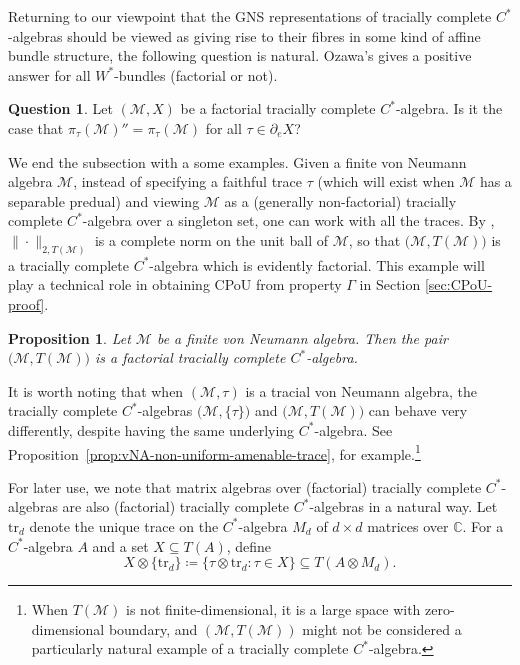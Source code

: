 \documentclass[a4paper,11pt]{amsart}
\newtheorem{proposition}[theorem]{Proposition}
\theoremstyle{definition}
\newtheorem{question}[theorem]{Question}
\numberwithin{equation}{section}
\numberwithin{theorem}{section}
\newcommand{\M}{\mathcal{M}}
\begin{document}
Returning to our viewpoint that the GNS representations of tracially complete $C^*$-algebras should be viewed as giving rise to their fibres in some kind of affine bundle structure, the following question is natural. Ozawa's \cite[Theorem 11]{Oz13} gives a positive answer for all $W^*$-bundles (factorial or not).
\begin{question}\label{Q:fibres}
Let $(\M,X)$ be a factorial tracially complete $C^*$-algebra.  Is it the case that $\pi_\tau(\M)''=\pi_\tau(\M)$ for all $\tau\in\partial_eX$?
\end{question}

We end the subsection with a some examples.  Given a finite von Neumann algebra $\M$, instead of specifying a faithful trace $\tau$ (which will exist when $\M$ has a separable predual) and viewing $\M$ as a (generally non-factorial) tracially complete $C^*$-algebra over a singleton set, one can work with all the traces.  By \cite[Proposition~3.1.6]{Ev18}, $\|\cdot\|_{2, T(\M)}$ is a complete norm on the unit ball of $\M$, so that $\big(\M, T(\M)\big)$ is a tracially complete $C^*$-algebra which is evidently factorial.  This example will play a technical role in obtaining CPoU from property $\Gamma$ in Section \ref{sec:CPoU-proof}.

\begin{proposition}\label{prop:finitevnastc}
    Let $\M$ be a finite von Neumann algebra.  Then the pair $\big(\M,T(\M)\big)$ is a factorial tracially complete $C^*$-algebra.
\end{proposition}

It is worth noting that when $(\M,\tau)$ is a tracial von Neumann algebra, the tracially complete $C^*$-algebras $\big(\M,\{\tau\}\big)$ and $\big(\M,T(\M)\big)$ can behave very differently, despite having the same underlying $C^*$-algebra. See Proposition~\ref{prop:vNA-non-uniform-amenable-trace}, for example.\footnote{When $T(\M)$ is not finite-dimensional, it is a large space with zero-dimensional boundary, and $(\M,T(\M))$ might not be considered a particularly natural example of a tracially complete $C^*$-algebra.}

For later use, we note that matrix algebras over (factorial) tracially complete $C^*$-algebras are also (factorial) tracially complete $C^*$-algebras in a natural way.  Let $\mathrm{tr}_d$ denote the unique trace on the $C^*$-algebra $M_d$ of $d \times d$ matrices over $\mathbb C$.  For a $C^*$-algebra $A$ and a set $X \subseteq T(A)$, define
\begin{equation}
	X \otimes \{\mathrm{tr}_d\} \coloneqq \{ \tau \otimes \mathrm{tr}_d : \tau \in X \} \subseteq T(A \otimes M_d).
\end{equation}
\end{document}
